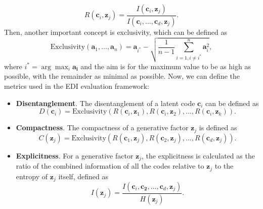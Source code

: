 \begin{equation}
    R(\mathbf{c}_i,\mathbf{z}_j) = \frac{I(\mathbf{c}_i, \mathbf{z}_j)}{I(\mathbf{c}_i,\dots,\mathbf{c}_d,\mathbf{z}_j)}.
\end{equation} 
Then, another important concept is exclusivity, which can be defined as 
\begin{equation}
    \text{Exclusivity}(\mathbf{a}_1,\dots,\mathbf{a}_n) = \mathbf{a}_{i^*} - \sqrt{\frac{1}{n-1} \sum_{i=1, i\neq i^*}^n \mathbf{a}_i^2}, 
\end{equation} 
where $i^* = \arg\max_i \mathbf{a_i}$ and the aim is for the maximum value to be as high as possible, with the remainder as minimal as possible. Now, we can define the metrics used in the EDI evaluation framework: 
\begin{itemize}
    \item \textbf{Disentanglement}. The disentanglement of a latent code $\mathbf{c}_i$ can be defined as 
    \begin{equation}
        D(\mathbf{c}_i) = \text{Exclusivity}(R(\mathbf{c}_i,\mathbf{z}_1), R(\mathbf{c}_i,\mathbf{z}_2),\dots,R(\mathbf{c}_i,\mathbf{z}_k)).
    \end{equation}
    \item \textbf{Compactness}. The compactness of a generative factor $\mathbf{z}_j$ is defined as 
    \begin{equation}
        C(\mathbf{z}_j) = \text{Exclusivity}(R(\mathbf{c}_1,\mathbf{z}_j), R(\mathbf{c}_2,\mathbf{z}_j),\dots,R(\mathbf{c}_d,\mathbf{z}_j)).
    \end{equation}
    \item \textbf{Explicitness}. For a generative factor $\mathbf{z}_j$, the explicitness is calculated as the ratio of the combined information of all the codes relative to $\mathbf{z}_j$ to the entropy of $\mathbf{z}_j$ itself, defined as 
    \begin{equation}
        I(\mathbf{z}_j) = \frac{I(\mathbf{c}_i, \mathbf{c_2},\dots,\mathbf{c}_d,\mathbf{z}_j)}{H(\mathbf{z}_j)}.
    \end{equation}
\end{itemize}


